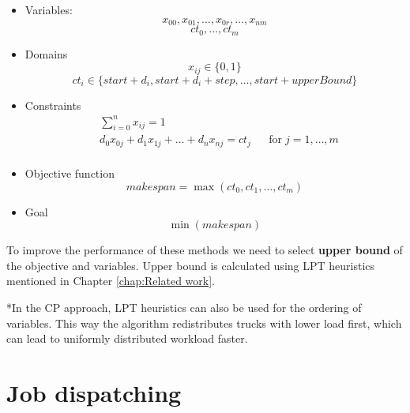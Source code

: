 \documentclass{ctuthesis}
\begin{document}
\begin{itemize}
    \item Variables:\\
    \begin{equation}
        x_{00}, x_{01}, \ldots, x_{0r}, \ldots, x_{nm}
    \end{equation}
    \begin{equation}
        ct_0, \ldots, ct_m
    \end{equation}
    \item Domains\\
    \begin{equation}
    x_{ij} \in \{0, 1\}
    \end{equation}
    \begin{equation}
    ct_{i} \in \{start+  d_i, start + d_i + step, \ldots, start + upperBound\}
    \end{equation}
    \item Constraints
    \begin{equation}
    \begin{aligned}
    & \sum_{i=0}^{n} x_{ij} = 1 &&\\
    & d_0x_{0j} + d_1x_{1j} + \ldots + d_nx_{nj} = ct_j && \text{for}\; j = 1, \ldots, m\\
    \end{aligned}
    \end{equation}
    \item Objective function\\
    \begin{equation}
        makespan = \max(ct_0, ct_1, \ldots, ct_m)
    \end{equation}
    \item Goal\\
    \begin{equation}
        \min(makespan)
    \end{equation}
\end{itemize}

To improve the performance of these methods we need to select \textbf{upper bound} of the objective and variables. Upper bound is calculated using LPT heuristics mentioned in Chapter \ref{chap:Related work}.


*In the CP approach, LPT heuristics can also be used for the ordering of variables. This way the algorithm redistributes trucks with lower load first, which can lead to uniformly distributed workload faster.


\section{Job dispatching}
\end{document}
